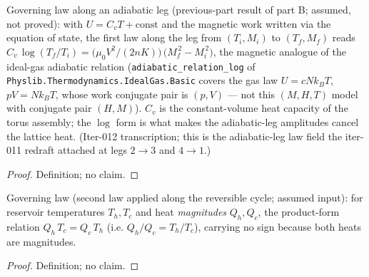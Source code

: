 \begin{definition}
\label{def:IPhO2026Problems_problem_IPhO_2026_3_C_2:AdiabaticLegStateLaw}
Governing law along an adiabatic leg (previous-part result of part B;
assumed, not proved): with $U = C_v T + \mathrm{const}$ and the
magnetic work written via the equation of state, the first law along
the leg from $(T_i, M_i)$ to $(T_f, M_f)$ reads
$C_v\,\log(T_f/T_i) =
\bigl(\mu_0 V^2/(2 n K)\bigr)\,\bigl(M_f^{\,2} - M_i^{\,2}\bigr)$,
the magnetic analogue of the ideal-gas adiabatic relation
(\texttt{adiabatic\_relation\_log} of
\texttt{Physlib.Thermodynamics.IdealGas.Basic} covers the gas law
$U = cNk_BT$, $pV = Nk_BT$, whose work conjugate pair is $(p,V)$ ---
not this $(M,H,T)$ model with conjugate pair $(H,M)$).  $C_v$ is the
constant-volume heat capacity of the torus assembly; the $\log$ form
is what makes the adiabatic-leg amplitudes cancel the lattice heat.
(Iter-012 transcription; this is the adiabatic-leg law field the
iter-011 redraft attached at legs $2\to3$ and $4\to1$.)
\end{definition}
\begin{proof}
Definition; no claim.
\end{proof}

\begin{definition}
\label{def:IPhO2026Problems_problem_IPhO_2026_3_C_2:CarnotHeatRatio}
Governing law (second law applied along the reversible cycle; assumed
input): for reservoir temperatures $T_h, T_c$ and heat
\emph{magnitudes} $Q_h, Q_c$, the product-form relation
$Q_h\,T_c = Q_c\,T_h$ (i.e. $Q_h/Q_c = T_h/T_c$), carrying no sign
because both heats are magnitudes.
\end{definition}
\begin{proof}
Definition; no claim.
\end{proof}

